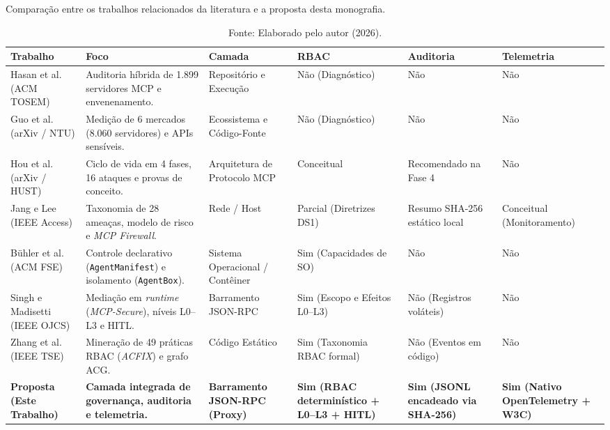 \begin{table}[H]
\centering
\caption{Comparação entre os trabalhos relacionados da literatura e a proposta desta monografia.}
\label{tab:comparativo_trabalhos}
\footnotesize
\setlength{\tabcolsep}{4pt}
\renewcommand{\arraystretch}{1.3}
\begin{tabular}{|p{2.5cm}|p{2.9cm}|p{2.2cm}|p{2.1cm}|p{2.1cm}|p{2.1cm}|}
\hline
\textbf{Trabalho} & \textbf{Foco} & \textbf{Camada} & \textbf{RBAC} & \textbf{Auditoria} & \textbf{Telemetria} \\
\hline
Hasan et al. \cite{hasan2026mcp} (ACM TOSEM) & Auditoria híbrida de 1.899 servidores MCP e envenenamento. & Repositório e Execução & Não (Diagnóstico) & Não & Não \\
\hline
Guo et al. \cite{guo2025measurement} (arXiv / NTU) & Medição de 6 mercados (8.060 servidores) e APIs sensíveis. & Ecossistema e Código-Fonte & Não (Diagnóstico) & Não & Não \\
\hline
Hou et al. \cite{hou2025mcp} (arXiv / HUST) & Ciclo de vida em 4 fases, 16 ataques e provas de conceito. & Arquitetura de Protocolo MCP & Conceitual & Recomendado na Fase 4 & Não \\
\hline
Jang e Lee \cite{jang2026hierarchical} (IEEE Access) & Taxonomia de 28 ameaças, modelo de risco e \textit{MCP Firewall}. & Rede / Host & Parcial (Diretrizes DS1) & Resumo SHA-256 estático local & Conceitual (Monitoramento) \\
\hline
Bühler et al. \cite{buhler2026agentbound} (ACM FSE) & Controle declarativo (\texttt{AgentManifest}) e isolamento (\texttt{AgentBox}). & Sistema Operacional / Contêiner & Sim (Capacidades de SO) & Não & Não \\
\hline
Singh e Madisetti \cite{singh2026mcpsecure} (IEEE OJCS) & Mediação em \textit{runtime} (\textit{MCP-Secure}), níveis L0--L3 e HITL. & Barramento JSON-RPC & Sim (Escopo e Efeitos L0--L3) & Não (Registros voláteis) & Não \\
\hline
Zhang et al. \cite{zhang2025acfix} (IEEE TSE) & Mineração de 49 práticas RBAC (\textit{ACFIX}) e grafo ACG. & Código Estático & Sim (Taxonomia RBAC formal) & Não (Eventos em código) & Não \\
\hline
\textbf{Proposta (Este Trabalho)} & \textbf{Camada integrada de governança, auditoria e telemetria.} & \textbf{Barramento JSON-RPC (Proxy)} & \textbf{Sim (RBAC determinístico + L0--L3 + HITL)} & \textbf{Sim (JSONL encadeado via SHA-256)} & \textbf{Sim (Nativo OpenTelemetry + W3C)} \\
\hline
\end{tabular}
\caption*{Fonte: Elaborado pelo autor (2026).}
\end{table}
